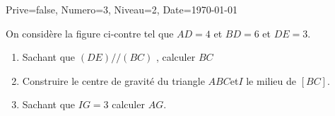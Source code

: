 \documentclass[a4paper,12pt]{article}
\begin{document}
\begin{Maquette}[DM]{Prive=false, Numero=3, Niveau=2, Date=\today}
\begin{exercice}
\begin{minipage}{0.6\linewidth}

On considère la figure ci-contre tel que $AD=4$ et $BD=6$ et $DE=3$. 
\begin{enumerate}
\item Sachant que $(DE)//(BC)$ , calculer $BC$
\item Construire le centre de gravité du triangle $ABC$et$I$ le milieu de $[BC]$.
\item Sachant que  $IG=3$ calculer $AG$.
\end{enumerate}
\end{minipage}
\begin{minipage}{0.4\linewidth}
\end{minipage}
\end{exercice}
\end{Maquette}
\end{document}
